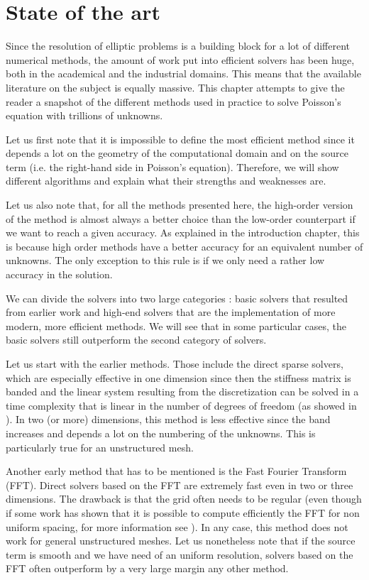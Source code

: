 \chapter{State of the art}

Since the resolution of elliptic problems is a building block for a lot of different numerical methods, the amount of work put into efficient solvers has been huge, both in the academical and the industrial domains. This means that the available literature on the subject is equally massive. This chapter attempts to give the reader a snapshot of the different methods used in practice to solve Poisson's equation with trillions of unknowns.

Let us first note that it is impossible to define the most efficient method since it depends a lot on the geometry of the computational domain and on the source term (i.e. the right-hand side in Poisson's equation). Therefore, we will show different algorithms and explain what their strengths and weaknesses are. 

Let us also note that, for all the methods presented here, the high-order version of the method is almost always a better choice than the low-order counterpart if we want to reach a given accuracy. As explained in the introduction chapter, this is because high order methods have a better accuracy for an equivalent number of unknowns. The only exception to this rule is if we only need a rather low accuracy in the solution.  

We can divide the solvers into two large categories : basic solvers that resulted from earlier work and high-end solvers that are the implementation of more modern, more efficient methods. We will see that in some particular cases, the basic solvers still outperform the second category of solvers. 

Let us start with the earlier methods. Those include the direct sparse solvers, which are especially effective in one dimension since then the stiffness matrix is banded and the linear system resulting from the discretization can be solved in a time complexity that is linear in the number of degrees of freedom (as showed in \cite{banded}). In two (or more) dimensions, this method is less effective since the band increases and depends a lot on the numbering of the unknowns. This is particularly true for an unstructured mesh. 

Another early method that has to be mentioned is the Fast Fourier Transform (FFT). Direct solvers based on the FFT are extremely fast even in two or three dimensions. The drawback is that the grid often needs to be regular (even though if some work has shown that it is possible to compute efficiently the FFT for non uniform spacing, for more information see \cite{fft}). In any case, this method does not work for general unstructured meshes. Let us nonetheless note that if the source term is smooth and we have need of an uniform resolution, solvers based on the FFT often outperform by a very large margin any other method. 


